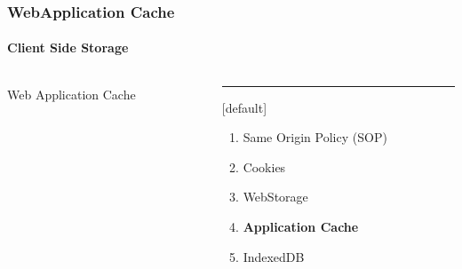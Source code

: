 \begin{frame}
\frametitle{WebApplication Cache}
\framesubtitle{Client Side Storage}
\begin{columns}[T] %
\begin{column}{.48\textwidth}

\begin{center}
{\Huge Web Application Cache}
\end{center}

\end{column}%
\hfill%
\begin{column}{.48\textwidth}
\color{blue}\rule{\linewidth}{4pt}

	[default]
	\begin{enumerate}
		\item Same Origin Policy (SOP)
		\item Cookies
		\item WebStorage
		\item \textbf{Application Cache}
		\item IndexedDB
	\end{enumerate}
\end{column}%
\end{columns}
\end{frame}

